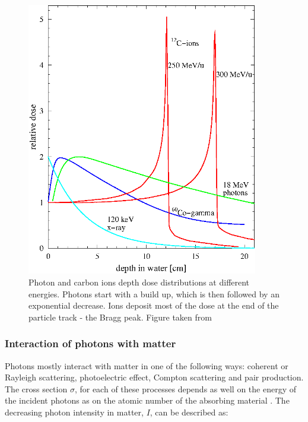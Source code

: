 \begin{figure}[H]
\begin{center}
\includegraphics[width=0.9\textwidth]{./Fundamentals/Images/depthdose.png}
\caption{Photon and carbon ions depth dose distributions at different energies. Photons start with a build up, which is then followed by an exponential decrease. Ions deposit most of the dose at the end of the particle track - the Bragg peak. Figure taken from \cite{Schardt2010} }
\label{ddp}
\end{center}
\end{figure}

\subsubsection{Interaction of photons with matter}

Photons mostly interact with matter in one of the following ways: coherent or Rayleigh scattering, photoelectric effect, Compton scattering and pair production. The cross section $\sigma$, for each of these processes depends as well on the energy of the incident photons as on the atomic number of the absorbing material \cite{Lilley2006}. The decreasing photon intensity in matter, $I$, can be described as:

